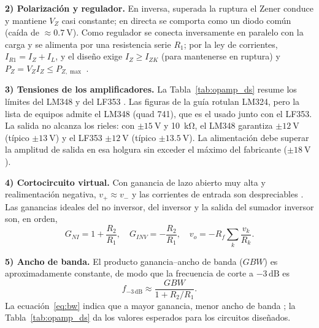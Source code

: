 \documentclass[9pt, conference]{IEEEtran}
\newcommand{\qV}[1]{\SI{#1}{\volt}}
\newcommand{\qkohm}[1]{\SI{#1}{\kilo\ohm}}
\begin{document}
\textbf{2) Polarización y regulador.} En inversa, superada la ruptura el Zener conduce y mantiene $V_Z$ casi constante; en directa se comporta como un diodo común (caída de $\approx\qV{0.7}$). Como regulador se conecta inversamente en paralelo con la carga y se alimenta por una resistencia serie $R_1$; por la ley de corrientes, $I_{R1}=I_Z+I_L$, y el diseño exige $I_Z\ge I_{ZK}$ (para mantenerse en ruptura) y $P_Z=V_ZI_Z\le P_{Z,\max}$ \cite{sedra}.

\textbf{3) Tensiones de los amplificadores.} La Tabla~\ref{tab:opamp_ds} resume los límites del LM348 \cite{lm348} y del LF353 \cite{lf353}. Las figuras de la guía rotulan LM324, pero la lista de equipos admite el LM348 (quad 741), que es el usado junto con el LF353. La salida no alcanza los rieles: con $\pm\qV{15}$ y \qkohm{10}, el LM348 garantiza $\pm\qV{12}$ (típico $\pm\qV{13}$) y el LF353 $\pm\qV{12}$ (típico $\pm\qV{13.5}$). La alimentación debe superar la amplitud de salida en esa holgura sin exceder el máximo del fabricante ($\pm\qV{18}$).

\textbf{4) Cortocircuito virtual.} Con ganancia de lazo abierto muy alta y realimentación negativa, $v_+\approx v_-$ y las corrientes de entrada son despreciables \cite{sedra}. Las ganancias ideales del no inversor, del inversor y la salida del sumador inversor son, en orden,
\begin{equation}
G_{NI}=1+\frac{R_2}{R_1},\quad G_{INV}=-\frac{R_2}{R_1},\quad v_o=-R_f\sum_k\frac{v_k}{R_k}.
\label{eq:ganancias}
\end{equation}

\textbf{5) Ancho de banda.} El producto ganancia--ancho de banda ($GBW$) es aproximadamente constante, de modo que la frecuencia de corte a $-3\,\mathrm{dB}$ es
\begin{equation}
f_{-3\,\mathrm{dB}}\approx\frac{GBW}{1+R_2/R_1}.
\label{eq:bw}
\end{equation}
La ecuación~\eqref{eq:bw} indica que a mayor ganancia, menor ancho de banda \cite{sedra}; la Tabla~\ref{tab:opamp_ds} da los valores esperados para los circuitos diseñados.
\end{document}
